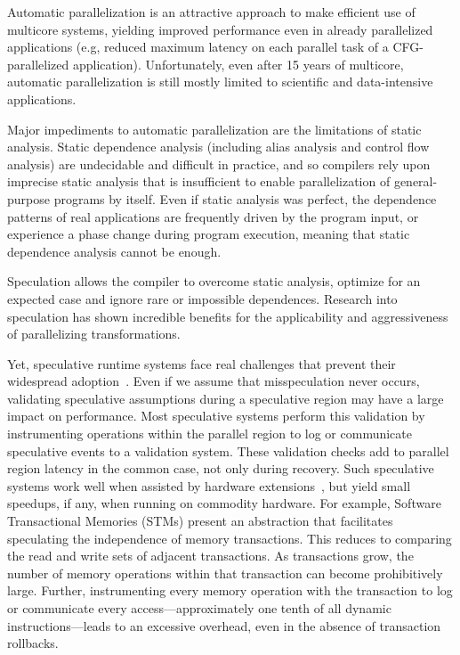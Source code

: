 Automatic parallelization is an attractive approach to make efficient use of
multicore systems, yielding improved performance even in already parallelized
applications (e.g, reduced maximum latency on each parallel task of a
CFG-parallelized application). Unfortunately, even after 15 years of multicore,
automatic parallelization is still mostly limited to scientific and
data-intensive applications.

Major impediments to automatic parallelization are the limitations of static
analysis. Static dependence analysis (including alias analysis and control flow
analysis) are undecidable and difficult in practice, and so compilers rely upon
imprecise static analysis that is insufficient to enable parallelization of
general-purpose programs by itself.
Even if static analysis was perfect, the dependence patterns of real
applications are frequently driven by the program input, or experience a phase
change during program execution, meaning that static dependence analysis cannot
be enough.

Speculation allows the compiler to overcome static analysis, optimize for an
expected
case and ignore rare or impossible dependences.  Research into speculation has
shown incredible benefits for the applicability and aggressiveness of
parallelizing transformations.

Yet, speculative runtime systems face real challenges that prevent their
widespread adoption~\cite{cascaval:08:stmtoy:short, ..}. Even if we assume that
misspeculation never occurs, validating speculative assumptions during a
speculative region may have a large impact on performance.
%
Most speculative systems perform this validation by instrumenting operations
within the parallel region to log or communicate speculative events to a
validation system.  These validation checks add to parallel region latency in
the common case, not only during recovery.
%
Such speculative systems work well when assisted by hardware
extensions~\cite{..}, but yield small speedups, if any, when running on
commodity hardware.
%
For example, Software Transactional Memories (STMs) present an abstraction that
facilitates speculating the independence of memory transactions.  This reduces
to comparing the read and write sets of adjacent transactions.  As transactions
grow, the number of memory operations within that transaction can become
prohibitively large. Further, instrumenting every memory operation with the
transaction to log or communicate every access---approximately one tenth of all
dynamic instructions---leads to an excessive overhead, even in the absence of
transaction rollbacks.

